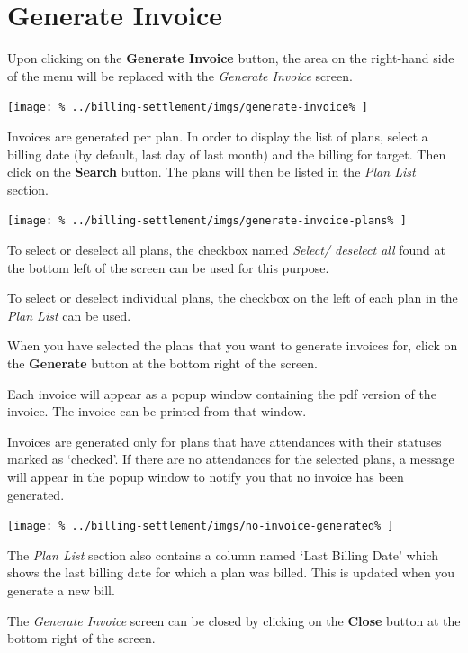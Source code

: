 \documentclass[../main/main]{subfiles}
\begin{document}
\newpage
\section{Generate Invoice}
\label{sec:generate-invoice}

Upon clicking on the \textbf{Generate Invoice} button,
the area on the right-hand side of the menu will be replaced with the
\emph{Generate Invoice} screen.

\texttt{[image: \%
  ../billing-settlement/imgs/generate-invoice\%
]}

Invoices are generated per plan. In order to display the list of plans,
select a billing date (by default, last day of last month) and the billing
for target. Then click on the \textbf{Search} button. The plans will then be
listed in the \emph{Plan List} section.

\texttt{[image: \%
  ../billing-settlement/imgs/generate-invoice-plans\%
]}

To select or deselect all plans, the checkbox named \emph{Select/ deselect all}
found at the bottom left of the screen can be used for this purpose.

To select or deselect individual plans, the checkbox on the left of each plan in
the \emph{Plan List} can be used.

When you have selected the plans that you want to generate invoices for,
click on the \textbf{Generate} button at the bottom right of the screen.

Each invoice will appear as a popup window containing the pdf version of
the invoice. The invoice can be printed from that window.

Invoices are generated only for plans that have attendances with their statuses
marked as `checked'. If there are no attendances for the selected plans, a
message will appear in the popup window to notify you that no invoice has been
generated.

\texttt{[image: \%
  ../billing-settlement/imgs/no-invoice-generated\%
]}

The \emph{Plan List} section also contains a column named `Last Billing Date'
which shows the last billing date for which a plan was billed. This is updated
when you generate a new bill.

The \emph{Generate Invoice} screen can be closed by clicking on the
\textbf{Close} button at the bottom right of the screen.
\end{document}
